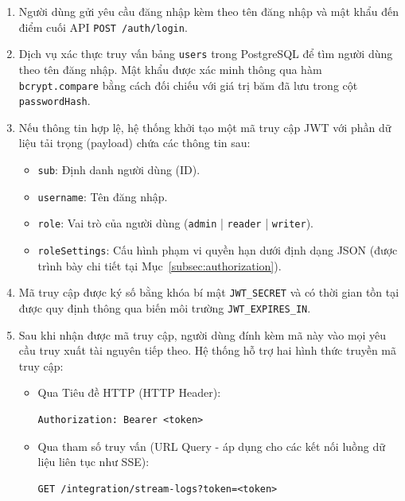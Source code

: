 \begin{enumerate}
    \item Người dùng gửi yêu cầu đăng nhập kèm theo tên đăng nhập và mật khẩu đến điểm cuối API \texttt{POST /auth/login}.

    \item Dịch vụ xác thực truy vấn bảng \texttt{users} trong PostgreSQL để tìm người dùng theo tên đăng nhập. Mật khẩu được xác minh thông qua hàm \texttt{bcrypt.compare} bằng cách đối chiếu với giá trị băm đã lưu trong cột \texttt{passwordHash}.

    \item Nếu thông tin hợp lệ, hệ thống khởi tạo một mã truy cập JWT với phần dữ liệu tải trọng (payload) chứa các thông tin sau:

    \begin{itemize}
        \item \texttt{sub}: Định danh người dùng (ID).
        \item \texttt{username}: Tên đăng nhập.
        \item \texttt{role}: Vai trò của người dùng (\texttt{admin} | \texttt{reader} | \texttt{writer}).
        \item \texttt{roleSettings}: Cấu hình phạm vi quyền hạn dưới định dạng JSON (được trình bày chi tiết tại Mục~\ref{subsec:authorization}).
    \end{itemize}

    \item Mã truy cập được ký số bằng khóa bí mật \texttt{JWT\_SECRET} và có thời gian tồn tại được quy định thông qua biến môi trường \texttt{JWT\_EXPIRES\_IN}.

    \item Sau khi nhận được mã truy cập, người dùng đính kèm mã này vào mọi yêu cầu truy xuất tài nguyên tiếp theo. Hệ thống hỗ trợ hai hình thức truyền mã truy cập:

    \begin{itemize}
        \item Qua Tiêu đề HTTP (HTTP Header):
\begin{verbatim}
Authorization: Bearer <token>
\end{verbatim}
        \item Qua tham số truy vấn (URL Query - áp dụng cho các kết nối luồng dữ liệu liên tục như SSE):
\begin{verbatim}
GET /integration/stream-logs?token=<token>
\end{verbatim}
    \end{itemize}
\end{enumerate}

